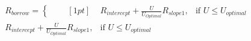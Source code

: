\documentclass[preview]{standalone}
\begin{document}
\begin{align*}
R_{borrow} = \begin{cases} \\[6pt] & \text{ } \\ & \text{ } \end{cases} [1pt] & R_{intercept} +  \frac{U}{U_{Optimal}} R_{slope1}, & \text{if }  U \leq U_{optimal} \\R_{intercept} +  \frac{U}{U_{Optimal}} R_{slope1}, & \text{if }  U \leq U_{optimal}
\end{align*}
\end{document}
